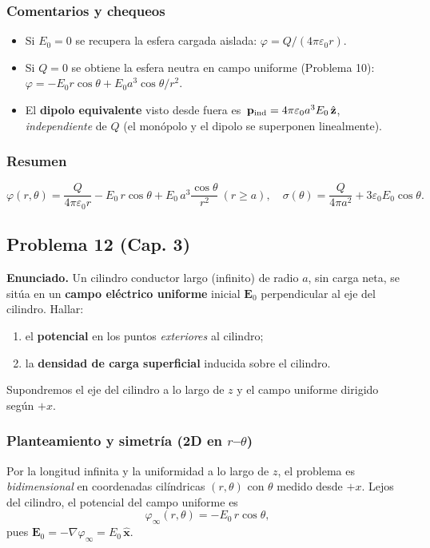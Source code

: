 \documentclass{article}
\begin{document}
\subsubsection*{Comentarios y chequeos}
\begin{itemize}
\item Si $E_0=0$ se recupera la esfera cargada aislada: $\varphi=Q/(4\pi\varepsilon_0 r)$.
\item Si $Q=0$ se obtiene la esfera neutra en campo uniforme (Problema 10): 
$\varphi=-E_0 r\cos\theta + E_0 a^3 \cos\theta/r^2$.
\item El \textbf{dipolo equivalente} visto desde fuera es $\,\mathbf p_{\rm ind}=4\pi\varepsilon_0 a^3 E_0\,\hat{\mathbf z}$, \emph{independiente} de $Q$ (el monópolo y el dipolo se superponen linealmente).
\end{itemize}

\subsubsection*{Resumen}
\[
\boxed{
\varphi(r,\theta)=\frac{Q}{4\pi\varepsilon_0 r}
-E_0\,r\cos\theta+E_0\,a^{3}\frac{\cos\theta}{r^{2}}\ (r\ge a),\quad
\sigma(\theta)=\frac{Q}{4\pi a^{2}}+3\varepsilon_0 E_0\cos\theta.}
\]


\subsection{Problema 12 (Cap. 3)} \vspace{0.5cm}

\textbf{Enunciado.} Un cilindro conductor largo (infinito) de radio $a$, sin carga neta, se sitúa en un \textbf{campo eléctrico uniforme} inicial $\mathbf E_0$ perpendicular al eje del cilindro. Hallar:
\begin{enumerate}[label=(\alph*)]
\item el \textbf{potencial} en los puntos \emph{exteriores} al cilindro;
\item la \textbf{densidad de carga superficial} inducida sobre el cilindro.
\end{enumerate}
Supondremos el eje del cilindro a lo largo de $z$ y el campo uniforme dirigido según $+x$.

\subsubsection*{Planteamiento y simetría (2D en $r$–$\theta$)}
Por la longitud infinita y la uniformidad a lo largo de $z$, el problema es \emph{bidimensional} en coordenadas cilíndricas $(r,\theta)$ con $\theta$ medido desde $+x$. Lejos del cilindro, el potencial del campo uniforme es
\[
\varphi_\infty(r,\theta)=-E_0\,r\cos\theta,
\]
pues $\mathbf E_0=-\nabla\varphi_\infty=E_0\,\hat{\mathbf x}$.
\end{document}
